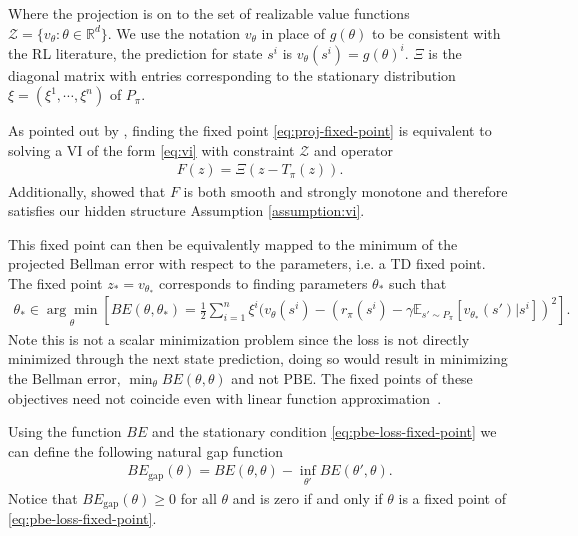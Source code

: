\documentclass{article} %
\theoremstyle{definition}
\newcommand{\reals}{\mathbb{R}}
\newcommand{\expect}[2][]{\mathbb{E}_{#1}\left[ #2\right]}
\begin{document}
Where the projection is on to the set of realizable value functions $\mathcal{Z} = \{v_\theta: \theta \in \reals^d\}$. 
We use the notation $v_{\theta}$ in place of $g(\theta)$ to be consistent with the RL literature, the prediction for state $s^i$ is $v_{\theta}(s^i) = g(\theta)^i$. 
$\Xi$ is the diagonal matrix with entries corresponding to the stationary distribution $\xi = (\xi^1,\cdots, \xi^n)$ of $P_{\pi}$.

As pointed out by \citet{bertsekas2009projected}, finding the fixed point \eqref{eq:proj-fixed-point} is equivalent to solving a VI of the form \eqref{eq:vi}
with constraint $\mathcal{Z}$ and operator \begin{align}
    F(z) = \Xi(z-T_\pi(z)).\label{eq:pbe-vi}
\end{align}
Additionally, \citet{bertsekas2009projected} showed that $F$ is both smooth and strongly monotone and therefore satisfies our hidden structure Assumption \ref{assumption:vi}.

This fixed point can then be equivalently mapped to the minimum of the projected Bellman error with respect to the parameters, i.e. a TD fixed point. 
The fixed point $z_\ast =v_{\theta_\ast}$ corresponds to finding parameters $\theta_\ast$ such that
\begin{align}\label{eq:pbe-loss-fixed-point}
    \theta_\ast \in \underset{\theta}{\arg\min} \left[ BE(\theta, \theta_\ast) =  \frac{1}{2} \sum_{i=1}^n \xi^i(v_{\theta}(s^i) - (r_\pi(s^i)- \gamma\expect[s'\sim P_\pi]{v_{\theta_\ast}(s')|s^i})^2\right].
\end{align}
Note this is not a scalar minimization problem since the loss is not directly minimized through the next state prediction, doing so would result in minimizing the Bellman error, $\min_{\theta} BE(\theta, \theta)$ and not PBE. 
The fixed points of these objectives need not coincide even with linear function approximation~\citep{sutton2018reinforcement}.

Using the function $BE$ and the stationary condition \eqref{eq:pbe-loss-fixed-point} we can define the following natural gap function
\begin{align}\label{eq:bellman-gap}
    BE_{\text{gap}}(\theta) = BE(\theta, \theta) - \inf_{\theta'} BE(\theta', 
    \theta).
\end{align}
Notice that $BE_{\text{gap}}(\theta) \geq 0 $ for all $\theta$ and is zero if and only if $\theta$ is a fixed point of \eqref{eq:pbe-loss-fixed-point}.
\end{document}

